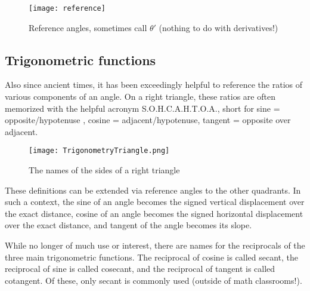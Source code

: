\begin{figure}[h]
\begin{center}
\texttt{[image: reference]}
\caption{Reference angles, sometimes call $\theta'$ (nothing to do with derivatives!)}
\end{center}
\end{figure}


\subsection{Trigonometric functions}
Also since ancient times, it has been exceedingly helpful to reference the ratios of
various components of an angle.  On a right triangle, these ratios are often memorized with
the helpful acronym S.O.H.C.A.H.T.O.A., short for sine = opposite/hypotenuse , cosine = 
adjacent/hypotenuse, tangent = opposite over adjacent.

\begin{figure}[h]
\texttt{[image: TrigonometryTriangle.png]}
\caption{The names of the sides of a right triangle}
\end{figure}

These definitions can be extended via reference angles to the other quadrants.  In 
such a context, the sine of an angle 
becomes the signed vertical displacement over the exact distance, cosine of an
angle becomes the signed horizontal displacement over the exact distance,
and tangent of the angle becomes its slope.

While no longer of much use or interest, there are names for the reciprocals of
the three main trigonometric functions.  The reciprocal of cosine is called
secant, the reciprocal of sine is called cosecant, and the reciprocal of tangent
is called cotangent.  Of these, only secant is commonly used (outside of math
classrooms!).

